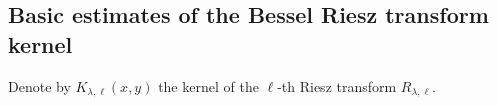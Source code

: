 \documentclass[12pt]{amsart}
\begin{document}
\subsection{Basic estimates of the Bessel Riesz transform kernel}
Denote by $K_{\lambda,\ell}(x,y)$ the kernel of the $\ell$-th Riesz transform $R_{\lambda,\ell}$.
\end{document}

